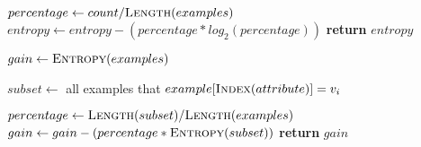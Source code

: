 \begin{algorithm}[t]
\begin{algorithmic}[1]
        \State $percentage \gets count / \textsc{Length}(examples)$
            \State $entropy \gets entropy - (percentage * log_2 (percentage))$
        \EndIf
    \EndFor
    \State \textbf{return} $entropy$
\EndProcedure

\begin{spacing}{0.5}
\end{spacing}

    \State $gain \gets \textsc{Entropy}(examples)$
    
        \State $subset \gets$ all examples that $example[\textsc{Index}(attribute)] = v_i$
        
        \State $percentage \gets \textsc{Length}(subset) / \textsc{Length}(examples)$
            \State $gain \gets gain - (percentage * \textsc{Entropy}(subset))$
        \EndIf
    \EndFor
    \State \textbf{return} $gain$
\EndProcedure

\end{algorithmic}
\end{algorithm}


